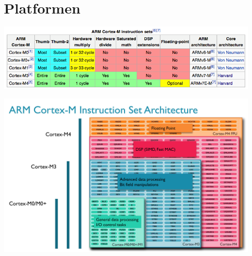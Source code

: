 \section{Platformen}
\begin{center}
	\includegraphics[width=\columnwidth]{Images/cortex_family}
\end{center}
\begin{center}
	\includegraphics[width=\columnwidth]{Images/cortex_instructions}
\end{center}